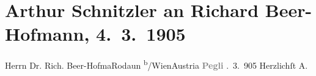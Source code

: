 

         
         \renewcommand{\erwaehntePersonen}{Personen: Richard Beer-Hofmann}
         \renewcommand{\erwaehnteOrte}{Orte: Pegli, Rodaun, Österreich}
         \renewcommand{\erwaehnteWerke}{}
               \section[Arthur Schnitzler an Richard Beer-Hofmann, 4. 3. 1905]{ Arthur Schnitzler an Richard Beer-Hofmann, 4. 3. 1905}\nopagebreak{}\rehead{ }\begin{ledgroupsized}[t]{13cm}\normalsize\beginnumbering \toendnotes[C]{\smallbreak\pagebreak[2]} 
\pstart{}{\pb}Herrn Dr. Rich. Beer-Hofma{\geminationn}\pend{}\pstart{}Rodaun \textsuperscript{b}/Wien\pend{}\pstart{}Austria\pend{}{\bigskip}\pstart
           \noindent{}\centering{}{\pb}\textcolor{gray}{\textbf{Pegli}}\pend
           . 3. 905\pend
           \pstart Herzlichſt \spacefill\mbox{A.}\pend{}
         
         \endnumbering{}\end{ledgroupsized}  \newcommand{\dateiname}{L01504}\newcommand{\titel}{Arthur Schnitzler an Richard Beer-Hofmann, 4. 3. 1905}\newcommand{\editorInnen}{Martin Anton Müller und Gerd-Hermann Susen}
      